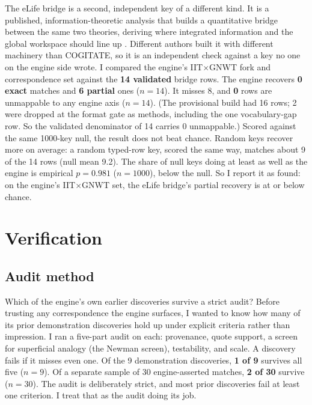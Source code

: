 \documentclass[11pt]{article}
\begin{document}
The eLife bridge is a second, independent key of a different kind. It is a published, information-theoretic
analysis that builds a quantitative bridge between the same two theories, deriving where integrated
information and the global workspace should line up \cite{luppi2024}. Different authors built it with
different machinery than COGITATE, so it is an independent check against a key no one on the engine side
wrote. I compared the engine's IIT$\times$GNWT fork and correspondence set against the \textbf{14 validated}
bridge rows. The engine recovers \textbf{0 exact} matches and \textbf{6 partial} ones ($n = 14$). It misses
8, and \textbf{0} rows are unmappable to any engine axis ($n = 14$). (The provisional build had 16 rows; 2
were dropped at the format gate as methods, including the one vocabulary-gap row. So the validated
denominator of 14 carries 0 unmappable.) Scored against the same 1000-key null, the result does not beat
chance. Random keys recover more on average: a random typed-row key, scored the same way, matches about 9
of the 14 rows (null mean 9.2). The share of null keys doing at least as
well as the engine is empirical \textbf{$p = 0.981$} ($n = 1000$), below the null. So I report it as found:
on the engine's IIT$\times$GNWT set, the eLife bridge's partial recovery is at or below chance.

\section{Verification}

\subsection{Audit method}
Which of the engine's own earlier discoveries survive a strict audit? Before trusting any correspondence
the engine surfaces, I wanted to know how many of its prior demonstration discoveries hold up under
explicit criteria rather than impression. I ran a five-part audit on each: provenance, quote support, a
screen for superficial analogy (the Newman screen), testability, and scale. A discovery fails if it misses
even one. Of the 9 demonstration discoveries, \textbf{1 of 9} survives all five ($n = 9$). Of a separate
sample of 30 engine-asserted matches, \textbf{2 of 30} survive ($n = 30$). The audit is deliberately
strict, and most prior discoveries fail at least one criterion. I treat that as the audit doing its job.
\end{document}
